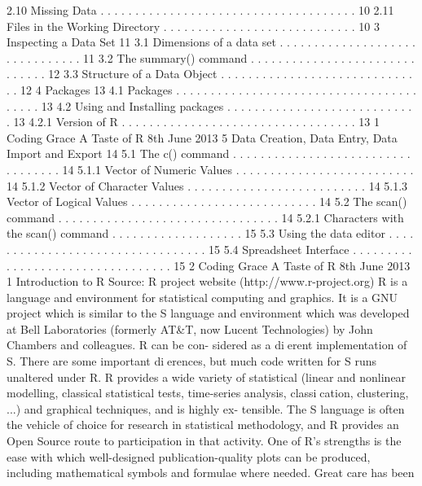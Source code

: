 2.10 Missing Data . . . . . . . . . . . . . . . . . . . . . . . . . . . . . . . . . . . . . 10
2.11 Files in the Working Directory . . . . . . . . . . . . . . . . . . . . . . . . . . . . 10
3 Inspecting a Data Set 11
3.1 Dimensions of a data set . . . . . . . . . . . . . . . . . . . . . . . . . . . . . . . 11
3.2 The summary() command . . . . . . . . . . . . . . . . . . . . . . . . . . . . . . 12
3.3 Structure of a Data Object . . . . . . . . . . . . . . . . . . . . . . . . . . . . . . 12
4 Packages 13
4.1 Packages . . . . . . . . . . . . . . . . . . . . . . . . . . . . . . . . . . . . . . . . 13
4.2 Using and Installing packages . . . . . . . . . . . . . . . . . . . . . . . . . . . . 13
4.2.1 Version of R . . . . . . . . . . . . . . . . . . . . . . . . . . . . . . . . . . 13
1
Coding Grace A Taste of R 8th June 2013
5 Data Creation, Data Entry, Data Import and Export 14
5.1 The c() command . . . . . . . . . . . . . . . . . . . . . . . . . . . . . . . . . . 14
5.1.1 Vector of Numeric Values . . . . . . . . . . . . . . . . . . . . . . . . . . 14
5.1.2 Vector of Character Values . . . . . . . . . . . . . . . . . . . . . . . . . . 14
5.1.3 Vector of Logical Values . . . . . . . . . . . . . . . . . . . . . . . . . . . 14
5.2 The scan() command . . . . . . . . . . . . . . . . . . . . . . . . . . . . . . . . 14
5.2.1 Characters with the scan() command . . . . . . . . . . . . . . . . . . . 15
5.3 Using the data editor . . . . . . . . . . . . . . . . . . . . . . . . . . . . . . . . . 15
5.4 Spreadsheet Interface . . . . . . . . . . . . . . . . . . . . . . . . . . . . . . . . . 15
2
Coding Grace A Taste of R 8th June 2013
1 Introduction to R
Source: R project website (http://www.r-project.org)
R is a language and environment for statistical computing and graphics. It is a GNU project
which is similar to the S language and environment which was developed at Bell Laboratories
(formerly AT&T, now Lucent Technologies) by John Chambers and colleagues. R can be con-
sidered as a dierent implementation of S. There are some important dierences, but much
code written for S runs unaltered under R.
R provides a wide variety of statistical (linear and nonlinear modelling, classical statistical tests,
time-series analysis, classication, clustering, ...) and graphical techniques, and is highly ex-
tensible. The S language is often the vehicle of choice for research in statistical methodology,
and R provides an Open Source route to participation in that activity.
One of R's strengths is the ease with which well-designed publication-quality plots can be
produced, including mathematical symbols and formulae where needed. Great care has been
